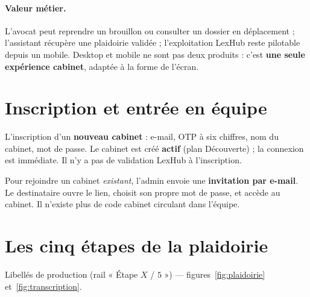\paragraph{Valeur métier.}
L'avocat peut reprendre un brouillon ou consulter un dossier en déplacement ; l'assistant récupère une plaidoirie validée ; l'exploitation LexHub reste pilotable depuis un mobile. Desktop et mobile ne sont pas deux produits : c'est \textbf{une seule expérience cabinet}, adaptée à la forme de l'écran.

\section{Inscription et entrée en équipe}

L'inscription d'un \textbf{nouveau cabinet} : e-mail, OTP à six chiffres, nom du cabinet, mot de passe. Le cabinet est créé \textbf{actif} (plan Découverte) ; la connexion est immédiate. Il n'y a pas de validation LexHub à l'inscription.

Pour rejoindre un cabinet \emph{existant}, l'admin envoie une \textbf{invitation par e-mail}. Le destinataire ouvre le lien, choisit son propre mot de passe, et accède au cabinet. Il n'existe plus de code cabinet circulant dans l'équipe.

\section{Les cinq étapes de la plaidoirie}
\label{sec:guide}

Libellés de production (rail « Étape $X$ / $5$ ») --- figures~\ref{fig:plaidoirie} et~\ref{fig:transcription}.

